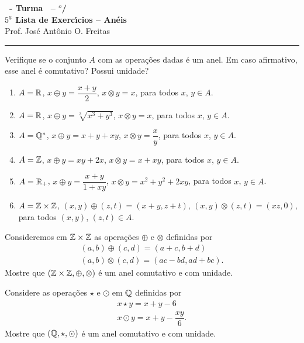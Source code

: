 \documentclass[12pt]{exam}
\begin{document}
\begin{center}
{\Large\bf \disciplina\ - Turma \turma\ -- \semestre$^{o}$/\ano} \\ \vspace{9pt} {\large\bf
  $5^{\underline{a}}$ Lista de Exerc{\'\i}cios -- An\'eis}\\ \vspace{9pt} Prof. Jos{\'e} Ant{\^o}nio O. Freitas
\end{center}
\hrule

\vspace{.6cm}

\questao{} Verifique se o conjunto $A$ com as operações dadas é um anel. Em caso afirmativo, esse anel é comutativo? Possui unidade?
\begin{enumerate}
	\item $A = \mathbb{R}$, $x \oplus y = \dfrac{x + y}{2}$, $x \otimes y = x$, para todos $x$, $y \in A$.
	\item $A = \mathbb{R}$, $x \oplus y = \sqrt[3]{x^3 + y^3}$, $x \otimes y = x$, para todos $x$, $y \in A$.
	\item $A = \mathbb{Q}^*$, $x \oplus y = x + y + xy$, $x \otimes y = \dfrac{x}{y}$, para todos $x$, $y \in A$.
	\item $A = \mathbb{Z}$, $x \oplus y = xy + 2x$, $x \otimes y = x + xy$, para todos $x$, $y \in A$.
	\item $A = \mathbb{R}_+$, $x \oplus y = \dfrac{x + y}{1 + xy}$, $x \otimes y = x^2 + y^2 + 2xy$, para todos $x$, $y \in A$.
	\item $A = \mathbb{Z} \times \mathbb{Z}$, $(x, y) \oplus (z, t) = (x + y, z + t)$, $(x, y) \otimes (z, t) = (xz, 0)$, para todos $(x, y)$, $(z, t) \in A$.
\end{enumerate}

\vspace{.2cm}

\questao{} Consideremos em $\mathbb{Z} \times \mathbb{Z}$ as opera\c{c}\~oes $\oplus$ e $\otimes$ definidas por
\begin{align*}
	(a, b) \oplus (c, d) = (a + c, b + d)\\
	(a ,b) \otimes (c, d) = (ac - bd, ad + bc).
\end{align*}
Mostre que $(\mathbb{Z} \times \mathbb{Z}, \oplus, \otimes)$ \'e um anel comutativo e com unidade.

\vspace{.2cm}

\questao{} Considere as opera\c{c}\~oes $\star$ e $\odot$ em $\mathbb{Q}$ definidas por
\begin{align*}
	x \star y = x + y - 6\\
	x \odot y = x + y - \dfrac{xy}{6}.
\end{align*}
Mostre que $(\mathbb{Q}, \star, \odot)$ \'e um anel comutativo e com unidade.
\end{document}
